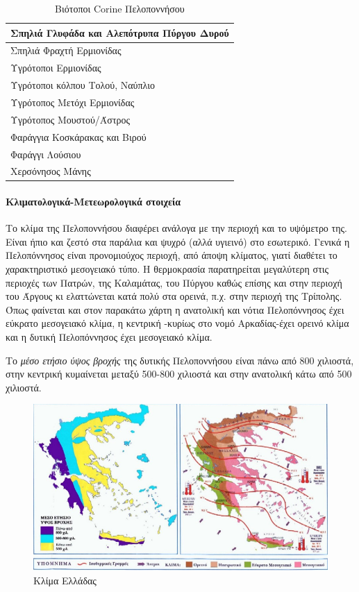\documentclass[12pt]{article}
\begin{document}
	\begin{table}[H]
		\centering
		\label{my-label}
		\begin{tabular}{|l|}
			\hline
			Σπηλιά Γλυφάδα και Αλεπότρυπα Πύργου Δυρού \\ \hline
			Σπηλιά Φραχτή Ερμιονίδας \\ \hline
			Υγρότοποι Ερμιονίδας \\ \hline
			Υγρότοποι κόλπου Τολού, Ναύπλιο \\ \hline
			Υγρότοπος Μετόχι Ερμιονίδας \\ \hline
			Υγρότοπος Μουστού/Άστρος \\ \hline 
			Φαράγγια Κοσκάρακας και Βιρού \\ \hline
			Φαράγγι Λούσιου \\ \hline
			Χερσόνησος Μάνης \\ \hline
		\end{tabular}
		\caption{Βιότοποι Corine Πελοποννήσου}
	\end{table}

	\paragraph{Κλιματολογικά-Μετεωρολογικά στοιχεία}
	
	Το κλίμα της Πελοποννήσου διαφέρει ανάλογα με την περιοχή και το υψόμετρο της. Είναι ήπιο και ζεστό στα παράλια και ψυχρό (αλλά υγιεινό) στο εσωτερικό. Γενικά η Πελοπόννησος είναι προνομιούχος περιοχή, από άποψη κλίματος, γιατί διαθέτει το χαρακτηριστικό μεσογειακό τύπο. Η θερμοκρασία παρατηρείται μεγαλύτερη στις περιοχές των Πατρών, της Καλαμάτας, του Πύργου καθώς επίσης και στην περιοχή του Άργους κι ελαττώνεται κατά πολύ στα ορεινά, π.χ. στην περιοχή της Τρίπολης. Όπως φαίνεται και στον παρακάτω χάρτη η ανατολική και νότια Πελοπόννησος έχει εύκρατο μεσογειακό κλίμα, η κεντρική -κυρίως στο νομό Αρκαδίας-έχει ορεινό κλίμα και η δυτική Πελοπόννησος έχει μεσογειακό κλίμα.
	
	Το \emph{μέσο ετήσιο ύψος βροχής} της δυτικής Πελοποννήσου είναι πάνω από 800 χιλιοστά, στην κεντρική κυμαίνεται μεταξύ 500-800 χιλιοστά και στην ανατολική κάτω από 500 χιλιοστά.
	
	\begin{figure} [H]
		\begin{center}
			\includegraphics [scale = 0.60] {klima.png}
			\caption{Κλίμα Ελλάδας}
		\end{center}
	\end{figure}
	
\end{document}
